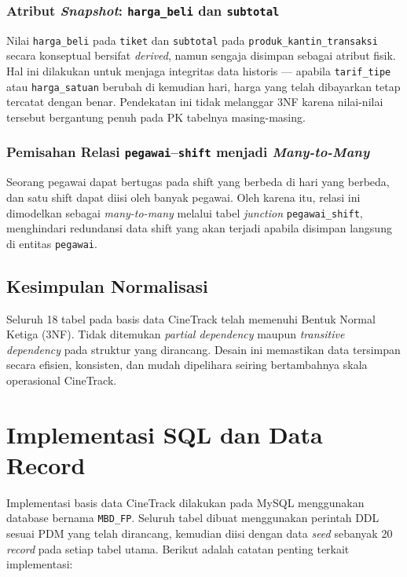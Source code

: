 \documentclass[letter,12pt,bahasa]{article}
\begin{document}
\subsubsection{Atribut \textit{Snapshot}: \texttt{harga\_beli} dan \texttt{subtotal}}
Nilai \texttt{harga\_beli} pada \texttt{tiket} dan \texttt{subtotal} pada \texttt{produk\_kantin\_transaksi} secara konseptual bersifat \textit{derived}, namun sengaja disimpan sebagai atribut fisik. Hal ini dilakukan untuk menjaga integritas data historis --- apabila \texttt{tarif\_tipe} atau \texttt{harga\_satuan} berubah di kemudian hari, harga yang telah dibayarkan tetap tercatat dengan benar. Pendekatan ini tidak melanggar 3NF karena nilai-nilai tersebut bergantung penuh pada PK tabelnya masing-masing.

\subsubsection{Pemisahan Relasi \texttt{pegawai}--\texttt{shift} menjadi \textit{Many-to-Many}}
Seorang pegawai dapat bertugas pada shift yang berbeda di hari yang berbeda, dan satu shift dapat diisi oleh banyak pegawai. Oleh karena itu, relasi ini dimodelkan sebagai \textit{many-to-many} melalui tabel \textit{junction} \texttt{pegawai\_shift}, menghindari redundansi data shift yang akan terjadi apabila disimpan langsung di entitas \texttt{pegawai}.

\subsection{Kesimpulan Normalisasi}

Seluruh 18 tabel pada basis data CineTrack telah memenuhi Bentuk Normal Ketiga (3NF). Tidak ditemukan \textit{partial dependency} maupun \textit{transitive dependency} pada struktur yang dirancang. Desain ini memastikan data tersimpan secara efisien, konsisten, dan mudah dipelihara seiring bertambahnya skala operasional CineTrack.

\clearpage

\section{Implementasi SQL dan Data Record}

Implementasi basis data CineTrack dilakukan pada MySQL menggunakan database bernama \texttt{MBD\_FP}. Seluruh tabel dibuat menggunakan perintah DDL sesuai PDM yang telah dirancang, kemudian diisi dengan data \textit{seed} sebanyak 20 \textit{record} pada setiap tabel utama. Berikut adalah catatan penting terkait implementasi:
\end{document}

